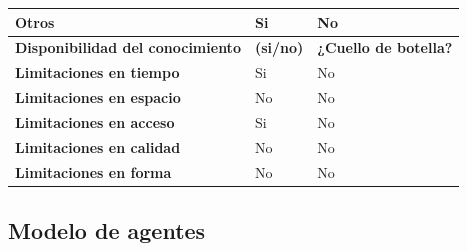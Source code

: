 \documentclass[a4paper,11pt]{article}
\begin{document}
\begin{center}
\begin{tabular}{| p{6.3cm} | l | p{3.8cm} |}
					\hline
					\textbf{Otros} & Si & No\\
					\hline
					\textbf{Disponibilidad del conocimiento} & \textbf{(si/no)} & \textbf{¿Cuello
					de botella?}\\
					\hline
					\textbf{Limitaciones en tiempo} & Si & No\\
					\hline
					\textbf{Limitaciones en espacio} & No & No\\
					\hline
					\textbf{Limitaciones en acceso} & Si & No\\
					\hline
					\textbf{Limitaciones en calidad} & No & No\\
					\hline
					\textbf{Limitaciones en forma} & No & No\\
					\hline
				\end{tabular}
			\end{center}
			\newpage
		\subsection{Modelo de agentes}
\end{document}
